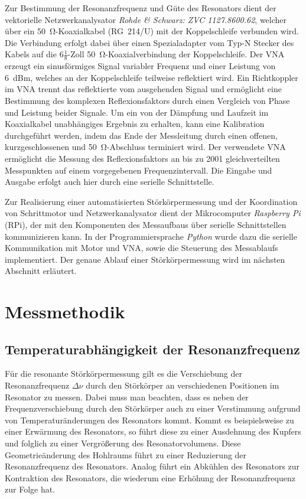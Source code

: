 Zur Bestimmung der Resonanzfrequenz und Güte des Resonators dient der vektorielle Netzwerkanalysator \textit{Rohde \& Schwarz: ZVC 1127.8600.62}, welcher über ein \SI{50}{\ohm}-Koaxialkabel (RG~214/U) mit der Koppelschleife verbunden wird.
Die Verbindung erfolgt dabei über einen Spezialadapter vom Typ-N Stecker des Kabels auf die $6\tfrac{1}{8}$-Zoll \SI{50}{\ohm}-Koaxialverbindung der Koppelschleife.
Der VNA erzeugt ein sinusförmiges Signal variabler Frequenz und einer Leistung von \SI{6}{dBm}, welches an der Koppelschleife teilweise reflektiert wird.
Ein Richtkoppler im VNA trennt das reflektierte vom ausgehenden Signal und ermöglicht eine Bestimmung des komplexen Reflexionsfaktors durch einen Vergleich von Phase und Leistung beider Signale.
Um ein von der Dämpfung und Laufzeit im Koaxialkabel unabhängiges Ergebnis zu erhalten, kann eine Kalibration durchgeführt werden, indem das Ende der Messleitung durch einen offenen, kurzgeschlossenen und \SI{50}{\ohm}-Abschluss terminiert wird.
Der verwendete VNA ermöglicht die Messung des Reflexionsfaktors an bis zu \num{2001} gleichverteilten Messpunkten auf einem vorgegebenen Frequenzintervall.
Die Eingabe und Ausgabe erfolgt auch hier durch eine serielle Schnittstelle.

Zur Realisierung einer automatisierten Störkörpermessung und der Koordination von Schrittmotor und Netzwerkanalysator dient der Mikrocomputer \textit{Raspberry Pi} (RPi), der mit den Komponenten des Messaufbaus über serielle Schnittstellen kommunizieren kann.
In der Programmiersprache \textit{Python} wurde dazu die serielle Kommunikation mit Motor und VNA, sowie die Steuerung des Messablaufs implementiert.
Der genaue Ablauf einer Störkörpermessung wird im nächsten Abschnitt erläutert.


\section{Messmethodik}

\subsection{Temperaturabhängigkeit der Resonanzfrequenz}
Für die resonante Störkörpermessung gilt es die Verschiebung der Resonanzfrequenz $\Delta \nu$ durch den Störkörper an verschiedenen Positionen im Resonator zu messen.
Dabei muss man beachten, dass es neben der Frequenzverschiebung durch den Störkörper auch zu einer Verstimmung aufgrund von Temperaturänderungen des Resonators kommt.
Kommt es beispielsweise zu einer Erwärmung des Resonators, so führt diese zu einer Ausdehnung des Kupfers und folglich zu einer Vergrößerung des Resonatorvolumens.
Diese Geometrieänderung des Hohlraums führt zu einer Reduzierung der Resonanzfrequenz des Resonators.
Analog führt ein Abkühlen des Resonators zur Kontraktion des Resonators, die wiederum eine Erhöhung der Resonanzfrequenz zur Folge hat.

